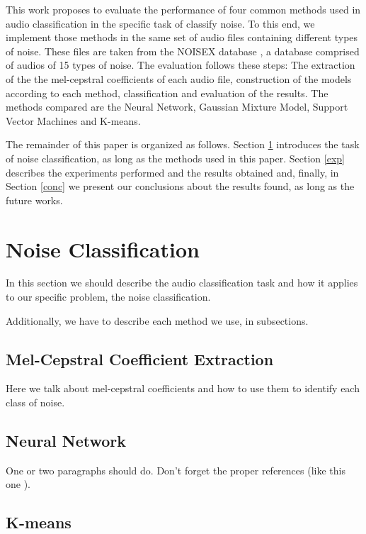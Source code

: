 \documentclass[12pt]{article}
\begin{document}
This work proposes to evaluate the performance of four common methods used in audio classification in the specific task of classify noise. To this end, we implement those methods in the same set of audio files containing different types of noise. These files are taken from the NOISEX database \cite{varga1993assessment}, a database comprised of audios of 15 types of noise. The evaluation follows these steps: The extraction of the the mel-cepstral coefficients of each audio file, construction of the models according to each method, classification and evaluation of the results. The methods compared are the Neural Network, Gaussian Mixture Model, Support Vector Machines and K-means.

The remainder of this paper is organized as follows. Section \ref{class} introduces the task of noise classification, as long as the methods used in this paper. Section \ref{exp} describes the experiments performed and the results obtained and, finally, in Section \ref{conc} we present our conclusions about the results found, as long as the future works.

\section{Noise Classification} \label{class}

In this section we should describe the audio classification task and how it applies to our specific problem, the noise classification.

Additionally, we have to describe each method we use, in subsections.

\subsection{Mel-Cepstral Coefficient Extraction} \label{class:melcepst}

Here we talk about mel-cepstral coefficients and how to use them to identify each class of noise.

\subsection{Neural Network} \label{class:nn}

One or two paragraphs should do. Don't forget the proper references (like this one \cite{lei2014novel}).

\subsection{K-means} \label{class:kmeans}
\end{document}
